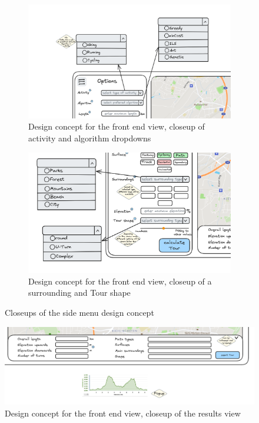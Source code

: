 \begin{figure}[H]
	\begin{subfigure}[t]{0.9\linewidth}
		\centering
		\includegraphics[width=\linewidth]{bilder/Concept closeup activity, algorithm.png}
		\caption{Design concept for the front end view, closeup of activity and algorithm dropdowns}
		\label{fig:frontendConceptCloseupDropdowns}	
	\end{subfigure}
	\hfill
	\begin{subfigure}[t]{0.9\linewidth}
		\centering
		\includegraphics[width=\linewidth]{bilder/Concept closeup surroundings, tour shape.png}
		\caption{Design concept for the front end view, closeup of a surrounding and Tour shape}
		\label{fig:frontendConceptCloseupButtons}		
	\end{subfigure}
	\caption{Closeups of the side menu design concept}
	\label{fig:frontendSideMenuCloseups}
\end{figure}


\begin{figure}[H]
	\includegraphics[width=0.9\linewidth]{bilder/Concept closeup tour stats, elevation profile.png}
	\caption{Design concept for the front end view, closeup of the results view}
	\label{fig:frontendConceptResultsCloseup}
\end{figure}

